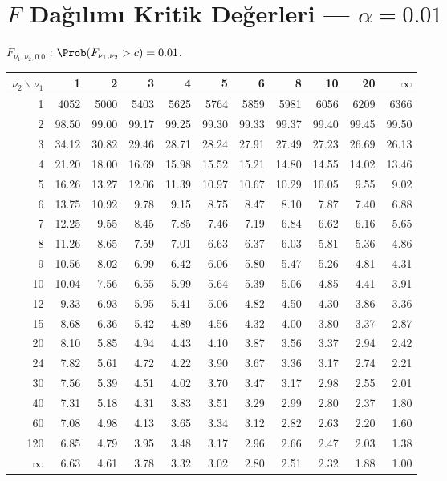 \section{$F$ Dağılımı Kritik Değerleri --- $\alpha=0.01$}
\label{app:f_tablo_01}

$F_{\nu_1,\nu_2,0.01}$: $\Prob(F_{\nu_1,\nu_2} > c) = 0.01$.

\begin{center}
\footnotesize
\renewcommand{\arraystretch}{1.12}
\begin{tabular}{r|rrrrrrrrrr}
\hline
$\nu_2 \backslash \nu_1$ & 1 & 2 & 3 & 4 & 5 & 6 & 8 & 10 & 20 & $\infty$ \\
\hline
1  & 4052 & 5000 & 5403 & 5625 & 5764 & 5859 & 5981 & 6056 & 6209 & 6366 \\
2  & 98.50 & 99.00 & 99.17 & 99.25 & 99.30 & 99.33 & 99.37 & 99.40 & 99.45 & 99.50 \\
3  & 34.12 & 30.82 & 29.46 & 28.71 & 28.24 & 27.91 & 27.49 & 27.23 & 26.69 & 26.13 \\
4  & 21.20 & 18.00 & 16.69 & 15.98 & 15.52 & 15.21 & 14.80 & 14.55 & 14.02 & 13.46 \\
5  & 16.26 & 13.27 & 12.06 & 11.39 & 10.97 & 10.67 & 10.29 & 10.05 &  9.55 &  9.02 \\
6  & 13.75 & 10.92 &  9.78 &  9.15 &  8.75 &  8.47 &  8.10 &  7.87 &  7.40 &  6.88 \\
7  & 12.25 &  9.55 &  8.45 &  7.85 &  7.46 &  7.19 &  6.84 &  6.62 &  6.16 &  5.65 \\
8  & 11.26 &  8.65 &  7.59 &  7.01 &  6.63 &  6.37 &  6.03 &  5.81 &  5.36 &  4.86 \\
9  & 10.56 &  8.02 &  6.99 &  6.42 &  6.06 &  5.80 &  5.47 &  5.26 &  4.81 &  4.31 \\
10 & 10.04 &  7.56 &  6.55 &  5.99 &  5.64 &  5.39 &  5.06 &  4.85 &  4.41 &  3.91 \\
12 &  9.33 &  6.93 &  5.95 &  5.41 &  5.06 &  4.82 &  4.50 &  4.30 &  3.86 &  3.36 \\
15 &  8.68 &  6.36 &  5.42 &  4.89 &  4.56 &  4.32 &  4.00 &  3.80 &  3.37 &  2.87 \\
20 &  8.10 &  5.85 &  4.94 &  4.43 &  4.10 &  3.87 &  3.56 &  3.37 &  2.94 &  2.42 \\
24 &  7.82 &  5.61 &  4.72 &  4.22 &  3.90 &  3.67 &  3.36 &  3.17 &  2.74 &  2.21 \\
30 &  7.56 &  5.39 &  4.51 &  4.02 &  3.70 &  3.47 &  3.17 &  2.98 &  2.55 &  2.01 \\
40 &  7.31 &  5.18 &  4.31 &  3.83 &  3.51 &  3.29 &  2.99 &  2.80 &  2.37 &  1.80 \\
60 &  7.08 &  4.98 &  4.13 &  3.65 &  3.34 &  3.12 &  2.82 &  2.63 &  2.20 &  1.60 \\
120 & 6.85 &  4.79 &  3.95 &  3.48 &  3.17 &  2.96 &  2.66 &  2.47 &  2.03 &  1.38 \\
$\infty$ & 6.63 & 4.61 & 3.78 & 3.32 & 3.02 & 2.80 & 2.51 & 2.32 & 1.88 & 1.00 \\
\hline
\end{tabular}
\end{center}

